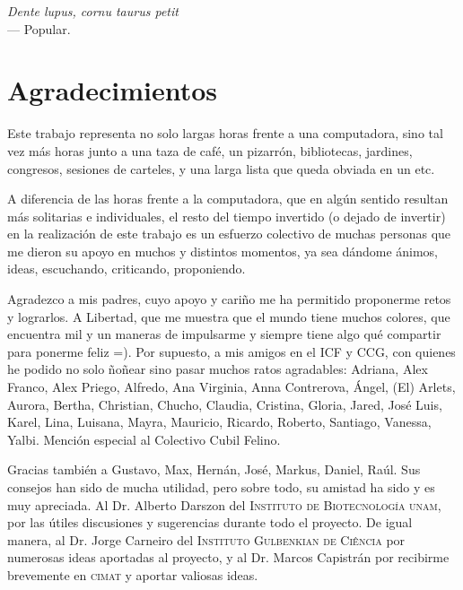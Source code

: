 
\begin{flushright}{\slshape
	Dente lupus, cornu taurus petit}\\
\medskip
    --- Popular.
\end{flushright}

\bigskip

\begingroup
\let\clearpage\relax
\let\cleardoublepage\relax
\let\cleardoublepage\relax
\chapter*{Agradecimientos}
Este trabajo representa no solo largas horas frente a una computadora, sino tal vez más horas junto a una taza de café, un pizarrón, bibliotecas, jardines, congresos, sesiones de carteles, y una larga lista que queda obviada en un etc.

A diferencia de las horas frente a la computadora, que en algún sentido resultan más solitarias e individuales, el resto del tiempo invertido (o dejado de invertir) en la realización de este trabajo es un esfuerzo colectivo de muchas personas que me dieron su apoyo en muchos y distintos momentos, ya sea dándome ánimos, ideas, escuchando, criticando, proponiendo.

Agradezco a mis padres, cuyo apoyo y cariño me ha permitido proponerme retos y lograrlos. A Libertad, que me muestra que el mundo tiene muchos colores, que encuentra mil y un maneras de impulsarme y siempre tiene algo qué compartir para ponerme feliz =). 
Por supuesto, a mis amigos en el ICF y CCG, con quienes he podido no solo ñoñear sino pasar muchos ratos agradables: Adriana, Alex Franco, Alex Priego, Alfredo, Ana Virginia, Anna Contrerova, Ángel, (El) Arlets, Aurora, Bertha, Christian, Chucho, Claudia, Cristina, Gloria, Jared, José Luis, Karel, Lina, Luisana, Mayra, Mauricio, Ricardo, Roberto, Santiago, Vanessa, Yalbi. Mención especial al Colectivo Cubil Felino.

Gracias también a Gustavo, Max, Hernán, José, Markus, Daniel, Raúl. Sus consejos han sido de mucha utilidad, pero sobre todo, su amistad ha sido y es muy apreciada. Al Dr. Alberto Darszon del \textsc{Instituto de Biotecnología unam}, por las útiles discusiones y sugerencias durante todo el proyecto. De igual manera, al Dr. Jorge Carneiro del \textsc{Instituto Gulbenkian de Ciência} por numerosas ideas aportadas al proyecto, y al Dr. Marcos Capistrán por recibirme brevemente en \textsc{cimat} y aportar valiosas ideas.

